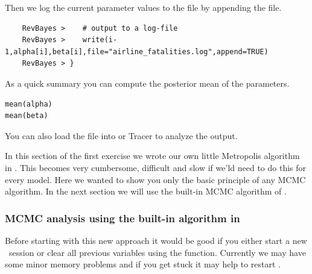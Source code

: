 Then we log the current parameter values to the file by appending the file.
{\tt \begin{snugshade*}
\begin{lstlisting}    
    RevBayes >    # output to a log-file
    RevBayes >    write(i-1,alpha[i],beta[i],file="airline_fatalities.log",append=TRUE)
    RevBayes > }
\end{lstlisting}
\end{snugshade*}}
As a quick summary you can compute the posterior mean of the parameters.
{\tt \begin{snugshade*}
\begin{lstlisting}    
mean(alpha)
mean(beta)
\end{lstlisting}
\end{snugshade*}}
You can also load the file into \R or Tracer to analyze the output.


In this section of the first exercise we wrote our own little Metropolis algorithm in \Rev.
This becomes very cumbersome, difficult and slow if we'ld need to do this for every model.
Here we wanted to show you only the basic principle of any MCMC algorithm.
In the next section we will use the built-in MCMC algorithm of \RevBayes.




\subsubsection*{MCMC analysis using the built-in algorithm in \RevBayes}
Before starting with this new approach it would be good if you either start a new \RevBayes~session or clear all previous variables using the  function.
Currently we may have some minor memory problems and if you get stuck it may help to restart \RevBayes.


